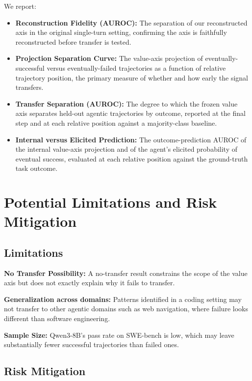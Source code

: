 \documentclass{article}
\begin{document}
We report:

\begin{itemize}
\item \textbf{Reconstruction Fidelity (AUROC):} The separation of our reconstructed axis in the original single-turn setting, confirming the axis is faithfully reconstructed before transfer is tested.
\item \textbf{Projection Separation Curve:} The value-axis projection of eventually-successful versus eventually-failed trajectories as a function of relative trajectory position, the primary measure of whether and how early the signal transfers.
\item \textbf{Transfer Separation (AUROC):} The degree to which the frozen value axis separates held-out agentic trajectories by outcome, reported at the final step and at each relative position against a majority-class baseline.
\item \textbf{Internal versus Elicited Prediction:} The outcome-prediction AUROC of the internal value-axis projection and of the agent's elicited probability of eventual success, evaluated at each relative position against the ground-truth task outcome.
\end{itemize}

\section{Potential Limitations and Risk Mitigation}

\subsection{Limitations}

\textbf{No Transfer Possibility:} A no-transfer result constrains the scope of the value axis but does not exactly explain why it fails to transfer.

\textbf{Generalization across domains:} Patterns identified in a coding setting may not transfer to other agentic domains such as web navigation, where failure looks different than software engineering. 

\textbf{Sample Size:} Qwen3-8B's pass rate on SWE-bench is low, which may leave substantially fewer successful trajectories than failed ones.

\subsection{Risk Mitigation}
\end{document}
